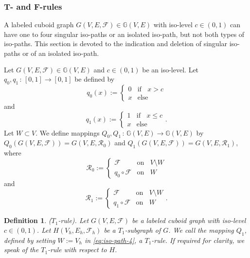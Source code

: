 \documentclass[a4paper,11pt]{article}
\newtheorem{definition}[theorem]{Definition}
\begin{document}
\subsubsection{T- and F-rules}
A labeled cuboid graph $G(V,E,\mathcal{F})\in\mathbb{G}(V,E)$ with iso-level $c\in (0,1)$ can have
one to four singular iso-paths or an isolated iso-path, but not both types of iso-paths. This section
is devoted to the indication and deletion of singular iso-paths or of an isolated iso-path.

Let $G(V,E,\mathcal{F})\in\mathbb{G}(V,E)$ and $c\in (0,1)$ be an iso-level. Let
$q_0, q_1\,:\,[0,1]\longrightarrow [0,1]$ be defined by
\begin{equation}
q_0(x):=\left\{
   \begin{array}{ll}
     0 & \mbox{if }\;\; x>c \\
     x & \mbox{else}
   \end{array}\right.
\label{eq:iso-path-1}
\end{equation}
and
\begin{equation}
q_1(x):=\left\{
   \begin{array}{ll}
     1 & \mbox{if }\;\; x\leq c \\
     x & \mbox{else}
   \end{array}\right..
\label{eq:iso-path-2}
\end{equation}
Let $W\subset V$. We define mappings $Q_0, Q_1\,:\,\mathbb{G}(V,E)\longrightarrow\mathbb{G}(V,E)$ by
$Q_0(G(V,E,\mathcal{F})) = G(V,E,\mathcal{R}_0)$ and $Q_1(G(V,E,\mathcal{F})) = G(V,E,\mathcal{R}_1)$, where
\begin{equation}
\mathcal{R}_0:=\left\{
   \begin{array}{ll}
     \mathcal{F} & \mbox{on }\;\; V\setminus W \\
     q_0\circ\mathcal{F} & \mbox{on }\;\; W
   \end{array}\right.
\label{eq:iso-path-3}
\end{equation}
and
\begin{equation}
\mathcal{R}_1:=\left\{
   \begin{array}{ll}
     \mathcal{F} & \mbox{on }\;\; V\setminus W \\
     q_1\circ\mathcal{F} & \mbox{on }\;\; W
   \end{array}\right..
\label{eq:iso-path-4}
\end{equation}

\begin{definition}($T_1$-rule). Let $G(V,E,\mathcal{F})$ be a labeled cuboid graph with iso-level
$c\in (0,1)$. Let $H(V_h,E_h,\mathcal{F}_h)$ be a $T_1$-subgraph of $G$. We call the mapping
$Q_1$, defined by setting $W:=V_h$ in \eqref{eq:iso-path-4}, a $T_1$-rule. If required for clarity,
we speak of the $T_1$-rule with respect to $H$.
\label{def:iso-path-6}
\end{definition}
\end{document}

